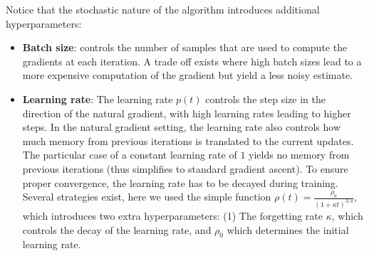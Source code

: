 
Notice that the stochastic nature of the algorithm introduces additional hyperparameters:

\begin{itemize}
    \item \textbf{Batch size}: controls the number of samples that are used to compute the gradients at each iteration. A trade off exists where high batch sizes lead to a more expensive computation of the gradient but yield a less noisy estimate.

    \item \textbf{Learning rate}: The learning rate $p(t)$ controls the step size in the direction of the natural gradient, with high learning rates leading to higher steps. In the natural gradient setting, the learning rate also controls how much memory from previous iterations is translated to the current updates. The particular case of a constant learning rate of $1$ yields no memory from previous iterations (thus simplifies to standard gradient ascent). To ensure proper convergence, the learning rate has to be decayed during training. Several strategies exist\cite{Ranganath2013}, here we used the simple function $\rho(t) = \frac{\rho_0}{(1 + \kappa t)^{3/4}}$, which introduces two extra hyperparameters: (1) The forgetting rate $\kappa$, which controls the decay of the learning rate, and $\rho_0$ which determines the initial learning rate.

\end{itemize}
